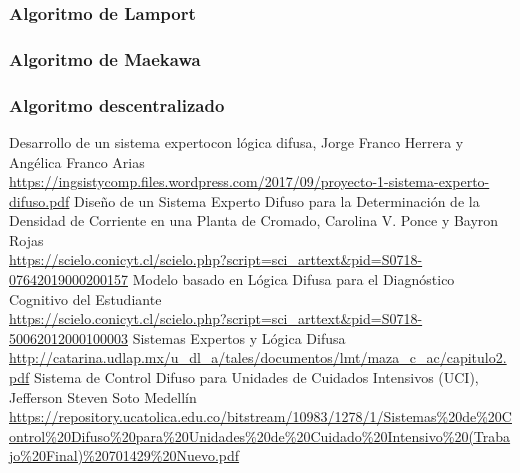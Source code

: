 \documentclass[a4paper, 11pt, titlepage]{article}
\begin{document}
        \subsubsection{Algoritmo de Lamport}

        \subsubsection{Algoritmo de Maekawa}

        \subsubsection{Algoritmo descentralizado}

\newpage
\begin{thebibliography}{X}
    \bibitem{} Desarrollo de un sistema expertocon lógica difusa, Jorge Franco Herrera y Angélica Franco Arias \\ \url{https://ingsistycomp.files.wordpress.com/2017/09/proyecto-1-sistema-experto-difuso.pdf}
    \bibitem{} Diseño de un Sistema Experto Difuso para la Determinación de la Densidad de Corriente en una Planta de Cromado, Carolina V. Ponce y Bayron Rojas \\ \url{https://scielo.conicyt.cl/scielo.php?script=sci_arttext&pid=S0718-07642019000200157}
    \bibitem{} Modelo basado en Lógica Difusa para el Diagnóstico Cognitivo del Estudiante \\ \url{https://scielo.conicyt.cl/scielo.php?script=sci_arttext&pid=S0718-50062012000100003}
    \bibitem{} Sistemas Expertos y Lógica Difusa \\ \url{http://catarina.udlap.mx/u_dl_a/tales/documentos/lmt/maza_c_ac/capitulo2.pdf}
    \bibitem{} Sistema de Control Difuso para Unidades de Cuidados Intensivos (UCI), Jefferson Steven Soto Medellín \\ \url{https://repository.ucatolica.edu.co/bitstream/10983/1278/1/Sistemas%20de%20Control%20Difuso%20para%20Unidades%20de%20Cuidado%20Intensivo%20(Trabajo%20Final)%20701429%20Nuevo.pdf}
\end{thebibliography}
\end{document}
